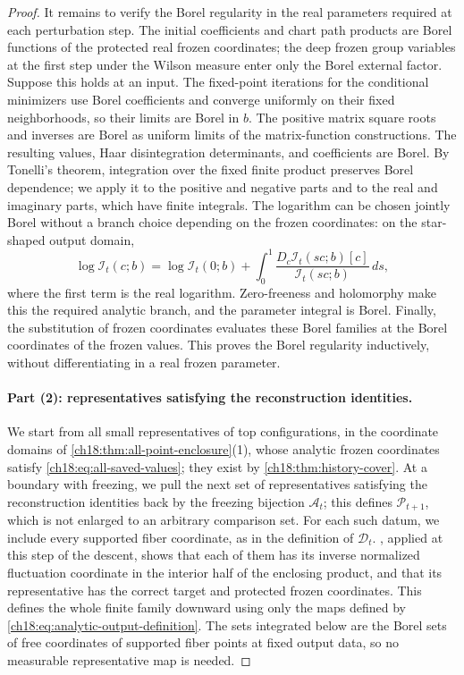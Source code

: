 \begin{proof}
It remains to verify the Borel regularity in the real parameters required at each perturbation step. The initial coefficients and chart path products are Borel functions of the protected real frozen coordinates; the deep frozen group variables at the first step under the Wilson measure enter only the Borel external factor. Suppose this holds at an input. The fixed-point iterations for the conditional minimizers use Borel coefficients and converge uniformly on their fixed neighborhoods, so their limits are Borel in $b$. The positive matrix square roots and inverses are Borel as uniform limits of the matrix-function constructions. The resulting values, Haar disintegration determinants, and coefficients are Borel. By Tonelli's theorem, integration over the fixed finite product preserves Borel dependence; we apply it to the positive and negative parts and to the real and imaginary parts, which have finite integrals. The logarithm can be chosen jointly Borel without a branch choice depending on the frozen coordinates: on the star-shaped output domain,
\[
 \log\mathcal I_t(c;b)
  =\log\mathcal I_t(0;b)
       +\int_0^1
        \frac{D_c\mathcal I_t(sc;b)[c]}{\mathcal I_t(sc;b)}\,ds,
\]
where the first term is the real logarithm. Zero-freeness and holomorphy make this the required analytic branch, and the parameter integral is Borel. Finally, the substitution of frozen coordinates evaluates these Borel families at the Borel coordinates of the frozen values. This proves the Borel regularity inductively, without differentiating in a real frozen parameter.

\paragraph{Part (2): representatives satisfying the reconstruction identities.}
We start from all small representatives of top configurations, in the coordinate domains of \cref{ch18:thm:all-point-enclosure}(1), whose analytic frozen coordinates satisfy \eqref{ch18:eq:all-saved-values}; they exist by \cref{ch18:thm:history-cover}. At a boundary with freezing, we pull the next set of representatives satisfying the reconstruction identities back by the freezing bijection $\mathcal A_t$; this defines $\mathscr P_{t+1}$, which is not enlarged to an arbitrary comparison set. For each such datum, we include every supported fiber coordinate, as in the definition of $\mathscr D_t$. , applied at this step of the descent, shows that each of them has its inverse normalized fluctuation coordinate in the interior half of the enclosing product, and that its representative has the correct target and protected frozen coordinates. This defines the whole finite family downward using only the maps defined by \eqref{ch18:eq:analytic-output-definition}. The sets integrated below are the Borel sets of free coordinates of supported fiber points at fixed output data, so no measurable representative map is needed.


\end{proof}
